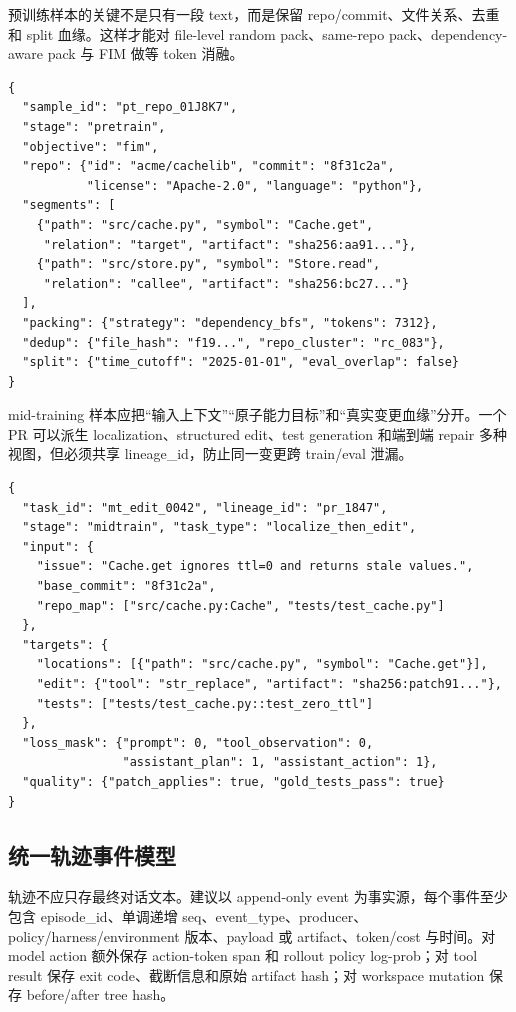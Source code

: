 \documentclass[10pt,a4paper,UTF8,fontset=none]{ctexart}
\newcommand{\ident}[1]{{\rmfamily #1}}
\begin{document}
预训练样本的关键不是只有一段 \ident{text}，而是保留 repo/commit、文件关系、去重和 split 血缘。这样才能对 file-level random pack、same-repo pack、dependency-aware pack 与 FIM 做等 token 消融。

\begin{lstlisting}[style=codeblock,caption={Repo-level 预训练/FIM 样例},label={lst:pretrain-sample}]
{
  "sample_id": "pt_repo_01J8K7",
  "stage": "pretrain",
  "objective": "fim",
  "repo": {"id": "acme/cachelib", "commit": "8f31c2a",
           "license": "Apache-2.0", "language": "python"},
  "segments": [
    {"path": "src/cache.py", "symbol": "Cache.get",
     "relation": "target", "artifact": "sha256:aa91..."},
    {"path": "src/store.py", "symbol": "Store.read",
     "relation": "callee", "artifact": "sha256:bc27..."}
  ],
  "packing": {"strategy": "dependency_bfs", "tokens": 7312},
  "dedup": {"file_hash": "f19...", "repo_cluster": "rc_083"},
  "split": {"time_cutoff": "2025-01-01", "eval_overlap": false}
}
\end{lstlisting}

mid-training 样本应把“输入上下文”“原子能力目标”和“真实变更血缘”分开。一个 PR 可以派生 localization、structured edit、test generation 和端到端 repair 多种视图，但必须共享 \ident{lineage\_id}，防止同一变更跨 train/eval 泄漏。

\begin{lstlisting}[style=codeblock,caption={PR/Issue 派生的 mid-training 原子任务},label={lst:midtrain-sample}]
{
  "task_id": "mt_edit_0042", "lineage_id": "pr_1847",
  "stage": "midtrain", "task_type": "localize_then_edit",
  "input": {
    "issue": "Cache.get ignores ttl=0 and returns stale values.",
    "base_commit": "8f31c2a",
    "repo_map": ["src/cache.py:Cache", "tests/test_cache.py"]
  },
  "targets": {
    "locations": [{"path": "src/cache.py", "symbol": "Cache.get"}],
    "edit": {"tool": "str_replace", "artifact": "sha256:patch91..."},
    "tests": ["tests/test_cache.py::test_zero_ttl"]
  },
  "loss_mask": {"prompt": 0, "tool_observation": 0,
                "assistant_plan": 1, "assistant_action": 1},
  "quality": {"patch_applies": true, "gold_tests_pass": true}
}
\end{lstlisting}

\subsection{统一轨迹事件模型}

轨迹不应只存最终对话文本。建议以 append-only event 为事实源，每个事件至少包含 \ident{episode\_id}、单调递增 \ident{seq}、\ident{event\_type}、producer、policy/harness/environment 版本、payload 或 artifact、token/cost 与时间。对 model action 额外保存 action-token span 和 rollout policy log-prob；对 tool result 保存 exit code、截断信息和原始 artifact hash；对 workspace mutation 保存 before/after tree hash。
\end{document}
